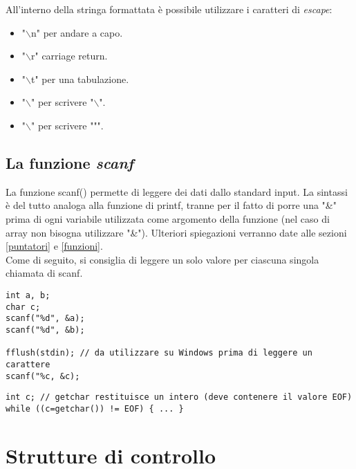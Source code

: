 All'interno della stringa formattata è possibile utilizzare i caratteri di \textit{escape}:
\begin{itemize}[noitemsep]
	\item \colorbox{light-gray}{"$\backslash$n"} per andare a capo.
	\item \colorbox{light-gray}{"$\backslash$r"} carriage return.
	\item \colorbox{light-gray}{"$\backslash$t"} per una tabulazione.
	\item \colorbox{light-gray}{"$\backslash$"} per scrivere "$\backslash$".
	\item \colorbox{light-gray}{"$\backslash$"} per scrivere """.
\end{itemize}


\subsection{La funzione \textit{scanf}}
La funzione \colorbox{light-gray}{scanf()} permette di leggere dei dati dallo standard input. La sintassi è del tutto analoga alla funzione di printf, tranne per il fatto di porre una "\&" prima di ogni variabile utilizzata come argomento della funzione (nel caso di array non bisogna utilizzare "\&"). Ulteriori spiegazioni verranno date alle sezioni \ref{puntatori} e \ref{funzioni}.\\
Come di seguito, si consiglia di leggere un solo valore per ciascuna singola chiamata di scanf.
\begin{lstlisting}[title={Esempi di input con scanf}]
int a, b;
char c;
scanf("%d", &a);
scanf("%d", &b);

fflush(stdin); // da utilizzare su Windows prima di leggere un carattere
scanf("%c, &c);
\end{lstlisting}

\begin{lstlisting}[title={Leggere una sequenza di caratteri uno alla volta}]
int c; // getchar restituisce un intero (deve contenere il valore EOF)
while ((c=getchar()) != EOF) { ... }
\end{lstlisting}

\section{Strutture di controllo}

